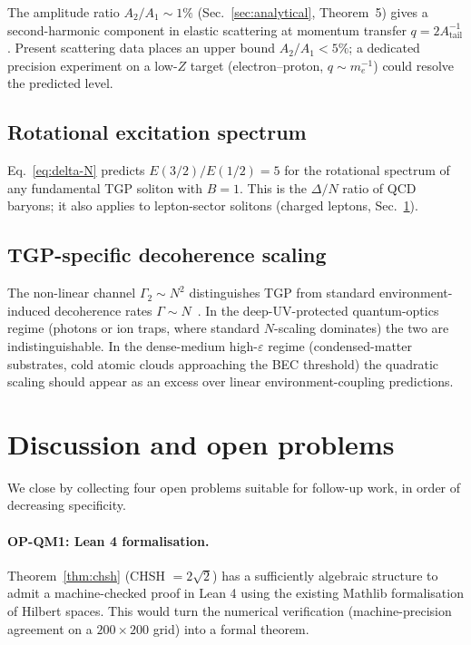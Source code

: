 \documentclass[11pt,a4paper]{article}
\newcommand{\Atail}{A_{\mathrm{tail}}}
\newcommand{\Nwind}{B}
\newcommand{\eps}{\varepsilon}
\begin{document}
The amplitude ratio $A_{2}/A_{1}\sim 1\%$
(Sec.~\ref{sec:analytical}, Theorem~5) gives a second-harmonic
component in elastic scattering at momentum transfer
$q=2\Atail^{-1}$. Present scattering data places an upper bound
$A_{2}/A_{1}<5\%$; a dedicated precision experiment on a
low-$Z$ target (electron--proton, $q\sim m_{e}^{-1}$) could resolve
the predicted level.

\subsection{Rotational excitation spectrum}

Eq.~\eqref{eq:delta-N} predicts $E(3/2)/E(1/2)=5$ for the
rotational spectrum of any fundamental TGP soliton with $\Nwind=1$.
This is the $\Delta/N$ ratio of QCD baryons; it also applies to
lepton-sector solitons (charged leptons, Sec.~\ref{sec:discussion}).

\subsection{TGP-specific decoherence scaling}

The non-linear channel $\Gamma_{2}\sim N^{2}$ distinguishes TGP
from standard environment-induced decoherence rates
$\Gamma\sim N$~\cite{Zurek2003}. In the deep-UV-protected
quantum-optics regime (photons or ion traps, where standard
$N$-scaling dominates) the two are indistinguishable. In the
dense-medium high-$\eps$ regime (condensed-matter substrates,
cold atomic clouds approaching the BEC threshold) the quadratic
scaling should appear as an excess over linear
environment-coupling predictions.

\section{Discussion and open problems}\label{sec:discussion}

We close by collecting four open problems suitable for follow-up
work, in order of decreasing specificity.

\paragraph{OP-QM1: Lean 4 formalisation.}
Theorem~\ref{thm:chsh} (CHSH $=2\sqrt{2}$) has a sufficiently
algebraic structure to admit a machine-checked proof in Lean 4
using the existing Mathlib formalisation of Hilbert spaces. This
would turn the numerical verification (machine-precision agreement
on a $200\times 200$ grid) into a formal theorem.
\end{document}

